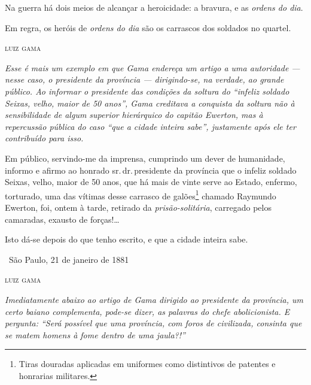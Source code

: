 Na guerra há dois meios de alcançar a heroicidade: a bravura, e as
\emph{ordens do dia}.

Em regra, os heróis de \emph{ordens do dia} são os carrascos dos
soldados no quartel.

\medskip
\hfill\textsc{luiz gama}


\begin{resumo}
\emph{Esse é mais um exemplo em que Gama endereça um artigo a uma
autoridade --- nesse caso, o presidente da província --- dirigindo-se, na
verdade, ao grande público. Ao informar o presidente das condições da
soltura do ``infeliz soldado Seixas, velho, maior de 50 anos'', Gama
creditava a conquista da soltura não à sensibilidade de algum superior
hierárquico do capitão Ewerton, mas à repercussão pública do caso ``que a
cidade inteira sabe'', justamente após ele ter contribuído para isso.}
\end{resumo}

Em público, servindo-me da imprensa, cumprindo um dever de humanidade,
informo e afirmo ao honrado sr.\,dr.\,presidente da província que o
infeliz soldado Seixas, velho, maior de 50 anos, que há mais de vinte
serve ao Estado, enfermo, torturado, uma das vítimas desse carrasco de
galões\footnote{Tiras douradas aplicadas em uniformes como distintivos
  de patentes e honrarias militares.}
chamado Raymundo Ewerton,
foi, ontem à tarde, retirado da \emph{prisão-solitária}, carregado pelos
camaradas, exausto de forças!\ldots{}

Isto dá-se depois do que tenho escrito, e que a cidade inteira sabe.

\medskip
\hfill\ São Paulo, 21 de janeiro de 1881

\hfill\textsc{luiz gama}


\begin{resumo}
\emph{Imediatamente abaixo ao artigo de Gama dirigido ao presidente da
província, um certo baiano complementa, pode-se dizer, as palavras do
chefe abolicionista. E pergunta: ``Será possível que uma província, com
foros de civilizada, consinta que se matem homens à fome dentro de uma
jaula?!'' }
\end{resumo}

